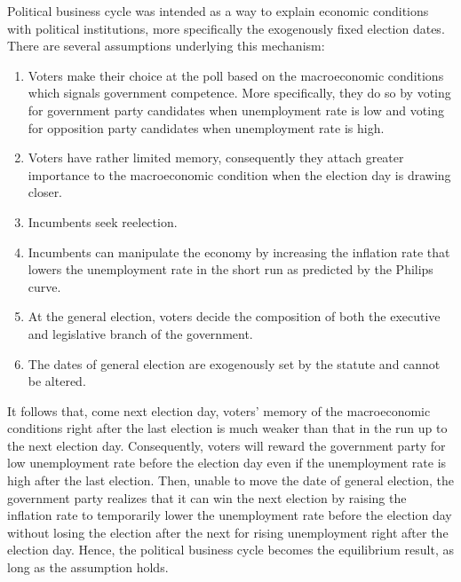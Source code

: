 \documentclass[hyphens, crop=false]{standalone}
\begin{document}
	Political business cycle
	was intended as a way to explain economic conditions
	with political institutions,
	more specifically the exogenously fixed election dates.
	There are several assumptions underlying this mechanism:
	\begin{enumerate}
		\item
		Voters make their choice at the poll based on the macroeconomic conditions
		which signals government competence.
		More specifically, they do so by voting for government party candidates
		when unemployment rate is low
		and voting for opposition party candidates
		when unemployment rate is high.
		\item
		Voters have rather limited memory,
		consequently they attach greater importance to the macroeconomic condition
		when the election day is drawing closer.
		\item
		Incumbents seek reelection.
		
		\item
		Incumbents can manipulate the economy by increasing the inflation rate
		that lowers the unemployment rate in the short run as predicted by the Philips curve.
		\item
		At the general election,
		voters decide the composition of both the executive and legislative branch of the government.
		\item
		The dates of general election are exogenously set by the statute
		and cannot be altered.
	\end{enumerate}
	It follows that,
	come next election day,
	voters' memory of the macroeconomic conditions right after the last election
	is much weaker than that in the run up to the next election day.
	Consequently,
	voters will reward the government party for low unemployment rate
	before the election day
	even if the unemployment rate is high after the last election.
	Then, unable to move the date of general election,
	the government party
	realizes that it can win the next election by
	raising the inflation rate to temporarily
	lower the unemployment rate before the election day
	without losing the election after the next
	for rising unemployment right after the election day.
	Hence, the political business cycle becomes the equilibrium result,
	as long as the assumption holds.
	
\end{document}
